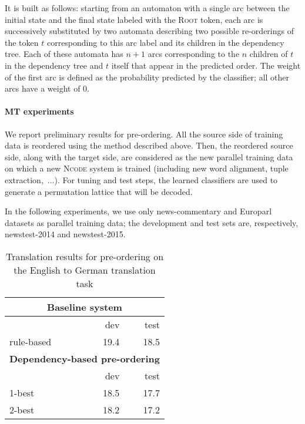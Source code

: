 \documentclass[11pt]{article}
\newcommand{\ncode}{\textsc{Ncode}\xspace}
\begin{document}
It is built as follows: starting from an
automaton with a single arc between the initial state and the final
state labeled with the \textsc{Root} token, each arc is successively
substituted by two automata describing two possible re-orderings of
the token $t$ corresponding to this arc label and its children in the
dependency tree. Each of these automata has $n + 1$ arcs corresponding
to the $n$ children of $t$ in the dependency tree and $t$ itself that
appear in the predicted order. The weight of the first arc is defined
as the probability predicted by the classifier; all other arcs have a
weight of 0.

\paragraph{MT experiments}
\label{par:mt-experiments}
We report preliminary results for pre-ordering.  All the source side
of training data is reordered using the method described above.
Then, the reordered source side, along with the target side, are
considered as the new parallel training data on which a new \ncode
system is trained (including new word alignment, tuple
extraction,~...). For tuning and test steps, the learned classifiers
are used to generate a permutation lattice that will be decoded.

In the following experiments, we use only news-commentary and
Europarl datasets as parallel training data; the development and 
test sets are, respectively, newstest-2014 and newstest-2015. 

\begin{table}[htb]
  \centering
  \begin{tabular}{lrr}
    \toprule
    \multicolumn{3}{c}{\textbf{Baseline system}}\\
    \midrule
 &dev&test \\
    \cmidrule{2-3}
    rule-based &19.4 &18.5 \\ 
    \midrule
   \multicolumn{3}{c}{\textbf{Dependency-based pre-ordering}}\\
    \midrule
 &dev&test \\
    \cmidrule{2-3}
    1-best &18.5 &17.7 \\
    2-best &18.2 &17.2 \\
    \bottomrule
  \end{tabular}
  \caption{Translation results for pre-ordering on the English to
    German translation task}
  \label{tab:preord-smt}
\end{table}
\end{document}
